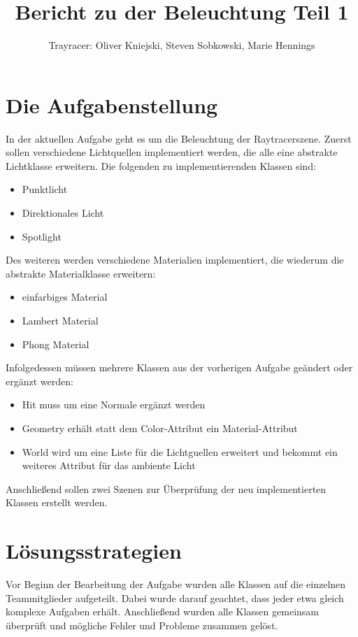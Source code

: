 \documentclass[a4paper,parskip=half,11pt]{scrartcl}
\author{Trayracer: Oliver Kniejski, Steven Sobkowski, Marie Hennings}
\title{Bericht zu der Beleuchtung Teil 1}
\begin{document}
 
\maketitle

\section*{Die Aufgabenstellung}
In der aktuellen Aufgabe geht es um die Beleuchtung der Raytracerszene.
Zuerst sollen verschiedene Lichtquellen implementiert werden, die alle eine abstrakte Lichtklasse erweitern.
Die folgenden zu implementierenden Klassen sind:
\begin{itemize}
\item Punktlicht
\item Direktionales Licht
\item Spotlight
\end{itemize}

Des weiteren werden verschiedene Materialien implementiert, die wiederum die abstrakte Materialklasse erweitern:
\begin{itemize}
\item einfarbiges Material
\item Lambert Material
\item Phong Material
\end{itemize}

Infolgedessen müssen mehrere Klassen aus der vorherigen Aufgabe geändert oder ergänzt werden:
\begin{itemize}
\item Hit muss um eine Normale ergänzt werden
\item Geometry erhält statt dem Color-Attribut ein Material-Attribut
\item World wird um eine Liste für die Lichtguellen erweitert und bekommt ein weiteres Attribut für das ambiente Licht
\end{itemize}

Anschließend sollen zwei Szenen zur Überprüfung der neu implementierten Klassen erstellt werden.

\section*{Lösungsstrategien}

Vor Beginn der Bearbeitung der Aufgabe wurden alle Klassen auf die einzelnen Teammitglieder
aufgeteilt. Dabei wurde darauf geachtet, dass jeder etwa gleich komplexe Aufgaben erhält.
Anschließend wurden alle Klassen gemeinsam überprüft und mögliche Fehler und Probleme
zusammen gelöst.
\end{document}
